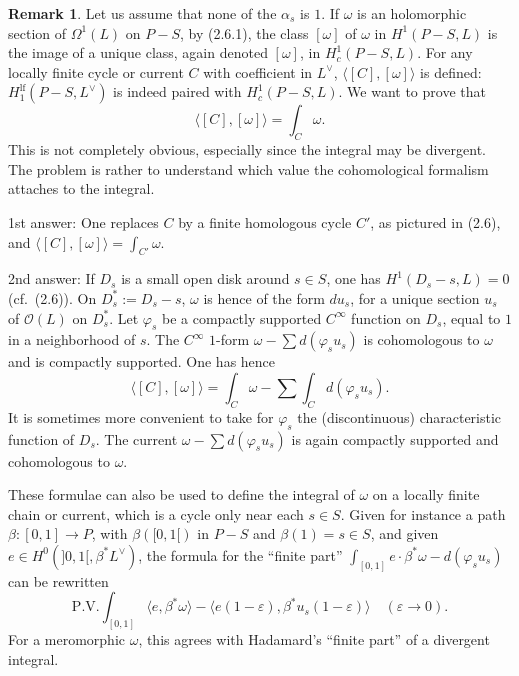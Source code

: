 \documentclass[12pt,a4paper]{article}
\theoremstyle{plain}
\theoremstyle{definition}
\newtheorem{remark}[theorem]{Remark}
\theoremstyle{remark}
\numberwithin{equation}{section}
\begin{document}
\begin{remark}\label{rmk:2.16}
Let us assume that none of the $\alpha_s$ is $1$. If $\omega$ is an holomorphic section of $\Omega^1(L)$ on $P-S$, by (2.6.1), the class $[\omega]$ of $\omega$ in $H^1(P-S, L)$ is the image of a unique class, again denoted $[\omega]$, in $H^1_c(P-S, L)$. For any locally finite cycle or current $C$ with coefficient in $L^\vee$, $\langle [C], [\omega] \rangle$ is defined: $H^{\mathrm{lf}}_1(P-S, L^\vee)$ is indeed paired with $H^1_c(P-S, L)$. We want to prove that
\[
\langle [C], [\omega] \rangle = \int_C \omega.
\]
This is not completely obvious, especially since the integral may be divergent. The problem is rather to understand which value the cohomological formalism attaches to the integral.

1st answer: One replaces $C$ by a finite homologous cycle $C'$, as pictured in (2.6), and $\langle [C], [\omega] \rangle = \int_{C'} \omega$.

2nd answer: If $D_s$ is a small open disk around $s \in S$, one has $H^1(D_s-s, L) = 0$ (cf.\ (2.6)). On $D_s^* := D_s - s$, $\omega$ is hence of the form $du_s$, for a unique section $u_s$ of $\mathcal{O}(L)$ on $D_s^*$. Let $\varphi_s$ be a compactly supported $C^\infty$ function on $D_s$, equal to $1$ in a neighborhood of $s$. The $C^\infty$ $1$-form $\omega - \sum d(\varphi_s u_s)$ is cohomologous to $\omega$ and is compactly supported. One has hence
\[
\langle [C], [\omega] \rangle = \int_C \omega - \sum \int_C d(\varphi_s u_s).
\]
It is sometimes more convenient to take for $\varphi_s$ the (discontinuous) characteristic function of $D_s$. The current $\omega - \sum d(\varphi_s u_s)$ is again compactly supported and cohomologous to $\omega$.

These formulae can also be used to define the integral of $\omega$ on a locally finite chain or current, which is a cycle only near each $s \in S$. Given for instance a path $\beta: [0,1] \to P$, with $\beta([0,1[)$ in $P-S$ and $\beta(1) = s \in S$, and given $e \in H^0(]0,1[, \beta^*L^\vee)$, the formula for the ``finite part'' $\int_{[0,1]} e \cdot \beta^*\omega - d(\varphi_s u_s)$ can be rewritten
\[
\mathrm{P.V.} \int_{[0,1]} \langle e, \beta^*\omega \rangle - \langle e(1-\varepsilon), \beta^*u_s(1-\varepsilon) \rangle \quad (\varepsilon \to 0).
\]
For a meromorphic $\omega$, this agrees with Hadamard's ``finite part'' of a divergent integral.
\end{remark}
\end{document}
